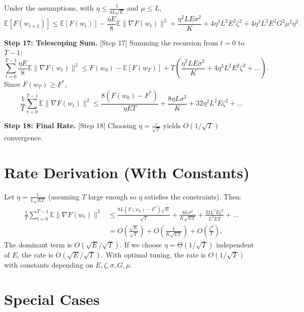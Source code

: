 \documentclass{article}
\begin{document}
\begin{lemma}
    Under the assumptions, with $\eta \leq \frac{1}{4L\sqrt{E}}$ and $\mu \leq L$,
    \begin{equation}
        \mathbb{E}[F(w_{t+1})] \leq \mathbb{E}[F(w_t)] - \frac{\eta E}{8} \mathbb{E} \| \nabla F(w_t) \|^2 + \frac{\eta^2 L E \sigma^2}{K} + 4 \eta^3 L^2 E^2 \zeta^2 + 4 \eta^3 L^2 E^2 G^2 \mu^2 \eta^2.
    \end{equation}
\end{lemma}

\textbf{Step 17: Telescoping Sum.} [Step 17]
Summing the recursion from $t=0$ to $T-1$:
\begin{equation}
    \sum_{t=0}^{T-1} \frac{\eta E}{8} \mathbb{E} \| \nabla F(w_t) \|^2 \leq F(w_0) - \mathbb{E}[F(w_T)] + T \left( \frac{\eta^2 L E \sigma^2}{K} + 4 \eta^3 L^2 E^2 \zeta^2 + \dots \right).
\end{equation}
Since $F(w_T) \geq F^*$,
\begin{equation}
    \frac{1}{T} \sum_{t=0}^{T-1} \mathbb{E} \| \nabla F(w_t) \|^2 \leq \frac{8(F(w_0) - F^*)}{\eta E T} + \frac{8 \eta L \sigma^2}{K} + 32 \eta^2 L^2 E \zeta^2 + \dots
\end{equation}

\textbf{Step 18: Final Rate.} [Step 18]
Choosing $\eta = \frac{c}{\sqrt{T}}$ yields $O(1/\sqrt{T})$ convergence.

\section*{Rate Derivation (With Constants)}

Let $\eta = \frac{1}{L \sqrt{E T}}$ (assuming $T$ large enough so $\eta$ satisfies the constraints). Then:
\begin{align}
    \frac{1}{T} \sum_{t=0}^{T-1} \mathbb{E} \| \nabla F(w_t) \|^2 &\leq \frac{8 L (F(w_0) - F^*) \sqrt{E}}{\sqrt{T}} + \frac{8 L \sigma^2}{K \sqrt{E T}} + \frac{32 L^2 E \zeta^2}{L^2 E T} + \dots \\
    &= O\left( \frac{\sqrt{E}}{\sqrt{T}} \right) + O\left( \frac{1}{K \sqrt{E T}} \right) + O\left( \frac{\zeta^2}{T} \right).
\end{align}
The dominant term is $O(\sqrt{E}/\sqrt{T})$. If we choose $\eta = \Theta(1/\sqrt{T})$ independent of $E$, the rate is $O(\sqrt{E}/\sqrt{T})$.
With optimal tuning, the rate is $O(1/\sqrt{T})$ with constants depending on $E, \zeta, \sigma, G, \mu$.

\section*{Special Cases}
\end{document}
